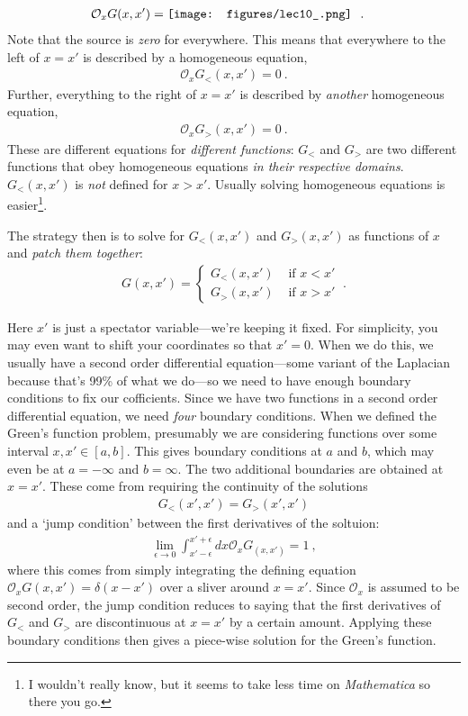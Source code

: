 \begin{align}
\mathcal O_x G(x,x')
&=
	\vcenter{
		\hbox{\texttt{[image: figures/lec10\_.png]}
		}}
	\ . 
\end{align}
Note that the source is \emph{zero} for everywhere. This means that everywhere to the left of $x=x'$ is described by a homogeneous equation,
\begin{align}
	\mathcal O_x G_<(x,x') = 0 \ .
\end{align}
Further, everything to the right of $x=x'$ is described by \emph{another} homogeneous equation,
\begin{align}
	\mathcal O_x G_>(x,x') = 0 \ .
\end{align}
These are different equations for \emph{different functions}: $G_<$ and $G_>$ are two different functions that obey homogeneous equations \emph{in their respective domains}. $G_<(x,x')$ is \emph{not} defined for $x>x'$. Usually solving homogeneous equations is easier\footnote{I wouldn't really know, but it seems to take less time on \emph{Mathematica} so there you go.}. 

The strategy then  is to solve for $G_<(x,x')$ and $G_>(x,x')$ as functions of $x$ and \emph{patch them together}: 
\begin{align}
	G(x,x') = 
	\begin{cases}
	G_<(x,x') & \text{ if } x<x'\\
	G_>(x,x') & \text{ if } x>x'
	\end{cases}\ .
\end{align}

Here $x'$ is just a spectator variable---we're keeping it fixed. For simplicity, you may even want to shift your coordinates so that $x'=0$. When we do this, we usually have a second order differential equation---some variant of the Laplacian because that's 99\% of what we do---so we need to have enough boundary conditions to fix our cofficients. Since we have two functions in a second order differential equation, we need \emph{four} boundary conditions. When we defined the Green's function problem, presumably we are considering functions over some interval $x,x'\in [a,b]$. This gives boundary conditions at $a$ and $b$, which may even be at $a=-\infty$ and $b=\infty$. The two additional boundaries are obtained at $x=x'$. These come from requiring the continuity of the solutions
\begin{align}
	G_<(x',x') = G_>(x',x')
\end{align}
and a `jump condition' between the first derivatives of the soltuion:
\begin{align}
	\lim_{\epsilon\to 0}\int_{x'-\epsilon}^{x'+\epsilon}dx \mathcal O_x G_(x,x') = 1 \ ,
\end{align}
where this comes from simply integrating the defining equation $\mathcal O_xG(x,x') = \delta(x-x')$ over a sliver around $x=x'$. Since $\mathcal O_x$ is assumed to be second order, the jump condition reduces to saying that the first derivatives of $G_<$ and $G_>$ are discontinuous at $x=x'$ by a certain amount. Applying these boundary conditions then gives a piece-wise solution for the Green's function.



